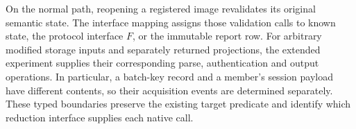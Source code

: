 On the normal path, reopening a registered image revalidates its original
semantic state. The interface mapping assigns those validation
calls to known state, the protocol interface $F$, or the immutable report
row. For arbitrary modified storage inputs and separately returned
projections, the extended experiment supplies their corresponding parse,
authentication and output operations. In particular, a batch-key record
and a member's session payload have different contents, so their acquisition
events are determined separately. These typed boundaries preserve the
existing target predicate and identify which reduction interface supplies
each native call.
